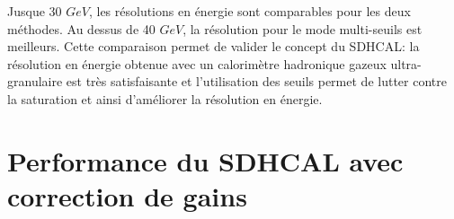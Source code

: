 Jusque 30 $GeV$, les résolutions en énergie sont comparables pour les deux méthodes. Au dessus de 40 $GeV$, la résolution pour le mode multi-seuils est meilleurs. Cette comparaison permet de valider le concept du SDHCAL: la résolution en énergie obtenue avec un calorimètre hadronique gazeux ultra-granulaire est très satisfaisante et l'utilisation des seuils permet de lutter contre la saturation et ainsi d'améliorer la résolution en énergie.

\section{Performance du SDHCAL avec correction de gains}
\label{sec.gainCorrectRes}
